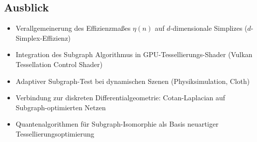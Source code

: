 ﻿\documentclass[a4paper,12pt]{article}
\theoremstyle{definition}
\begin{document}
\subsection{Ausblick}

\begin{itemize}
	\item Verallgemeinerung des Effizienzma\ss{}es $\eta(n)$ auf
	      $d$-dimensionale Simplizes ($d$-Simplex-Effizienz)
	\item Integration des Subgraph Algorithmus in GPU-Tessellierungs-Shader
	      (Vulkan Tessellation Control Shader)
	\item Adaptiver Subgraph-Test bei dynamischen Szenen
	      (Physiksimulation, Cloth)
	\item Verbindung zur diskreten Differentialgeometrie:
	      Cotan-Laplacian auf Subgraph-optimierten Netzen
	\item Quantenalgorithmen f\"ur Subgraph-Isomorphie als Basis
	      neuartiger Tessellierungsoptimierung
\end{itemize}
\end{document}
